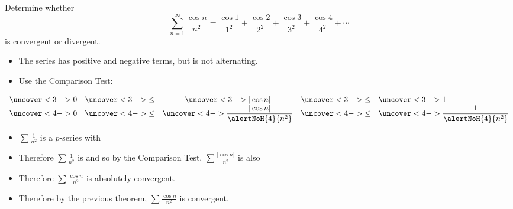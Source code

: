 \begin{frame}
\begin{example} %
Determine whether
\abovedisplayskip=0pt
\belowdisplayskip=0pt
\[
\sum_{n=1}^\infty \frac{\cos n}{n^2} = \frac{\cos 1}{1^2} + \frac{\cos 2}{2^2} + \frac{\cos 3}{3^2} + \frac{\cos 4}{4^2} + \cdots%
\]
is convergent or divergent.
\begin{itemize}
\item<2->  The series has positive and negative terms, but is not alternating.
\item<3->  Use the Comparison Test:
\end{itemize}
\abovedisplayskip=0pt
\belowdisplayskip=0pt
\[
\displaystyle \begin{array}{rcccl}
\uncover<3->{%
0%
}%
& \uncover<3->{ \leq } & %
\uncover<3->{%
| \cos n |%
}%
& \uncover<3->{ \leq } & %
\uncover<3->{%
1%
}\\%
\uncover<4->{%
0%
}%
& \uncover<4->{ \leq } & %
\uncover<4->{%
\displaystyle \frac{| \cos n |}{\alertNoH{ 4}{n^2}}%
}%
& \uncover<4->{ \leq } & %
\uncover<4->{%
\displaystyle \frac{1}{\alertNoH{ 4}{n^2}}%
}%
\end{array}
\]
\vspace{-.5cm}
\begin{itemize}
\item<5->  $\sum \frac{1}{n^2}$ is a $p$-series with 
\item<7->  Therefore $\sum \frac{1}{n^2}$ is  and so by the Comparison Test, $\sum \frac{|\cos n|}{n^2}$ is also 
\item<9->  Therefore $\sum \frac{\cos n}{n^2}$ is absolutely convergent.
\item<10->  Therefore by the previous theorem, $\sum \frac{\cos n}{n^2}$ is convergent.
\end{itemize}
\end{example}
\end{frame}
